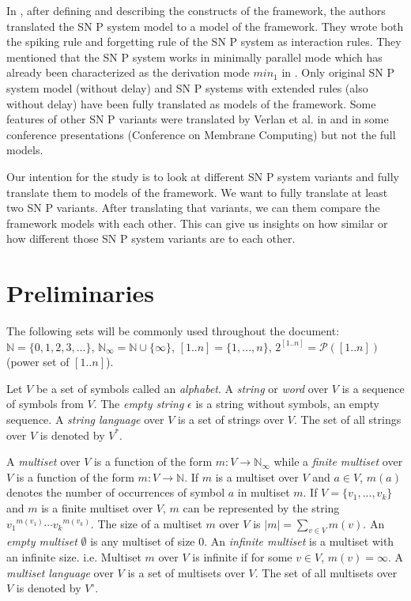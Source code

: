 \documentclass[a4paper]{article}
\theoremstyle{definition}
\newcommand{\ra}{\rightarrow}
\begin{document}
In \cite{verlan-2020-ff-snp}, after defining and describing the constructs of the framework, the
authors translated the SN P system model to a model of the framework. They wrote both the spiking
rule and forgetting rule of the SN P system as interaction rules. They mentioned that the SN P
system works in minimally parallel mode which has already been characterized as the derivation mode
$min_1$ in \cite{freund-2007-ff-stat}. Only original SN P system model (without delay) and SN P 
systems with extended rules (also without delay) have been fully translated as models of the 
framework. Some features of other SN P variants were translated by Verlan et al. in 
\cite{verlan-2020-ff-snp} and in some conference presentations (Conference on Membrane Computing)
but not the full models.

Our intention for the study is to look at different SN P system variants and fully translate them
to models of the framework. We want to fully translate at least two SN P variants. After translating
that variants, we can them compare the framework models with each other. This can give us insights
on how similar or how different those SN P system variants are to each other.


\section{Preliminaries}

The following sets will be commonly used throughout the document: $\mathbb{N} = \{0,1,2,3,...\}$,
$\mathbb{N}_{\infty} = \mathbb{N} \cup \{\infty\}$, $[1..n] = \{1,...,n\}$, 
$2^{[1..n]}=\mathcal{P}([1..n])$ (power set of $[1..n]$).

Let $V$ be a set of symbols called an \emph{alphabet}. A \emph{string} or \emph{word} over $V$ is
a sequence of symbols from $V$. The \emph{empty string} $\epsilon$ is a string without symbols, an 
empty sequence. A \emph{string language} over $V$ is a set of strings over $V$. The set of all 
strings over $V$ is denoted by $V^*$.

A \emph{multiset} over $V$ is a function of the form $m: V \ra \mathbb{N}_{\infty}$ while a
\emph{finite multiset} over $V$ is a function of the form $m: V \ra \mathbb{N}$. If $m$ is a
multiset over $V$ and $a \in V$, $m(a)$ denotes the number of occurrences of symbol $a$ in multiset
$m$. If $V=\{v_1,...,v_k\}$ and $m$ is a finite multiset over $V$, $m$ can be represented by the
string ${v_1}^{m(v_1)}\cdots {v_k}^{m(v_k)}$. The size of a multiset $m$ over $V$ is
$|m| = \sum_{v\in V}m(v)$. An \emph{empty multiset} $\emptyset$ is any multiset of size $0$. An
\emph{infinite multiset} is a multiset with an infinite size. i.e. Multiset $m$ over $V$ is infinite
if for some $v\in V$, $m(v) = \infty$. A \emph{multiset language} over $V$ is a set of multisets 
over $V$. The set of all multisets over $V$ is denoted by $V^{\circ}$.
\end{document}

